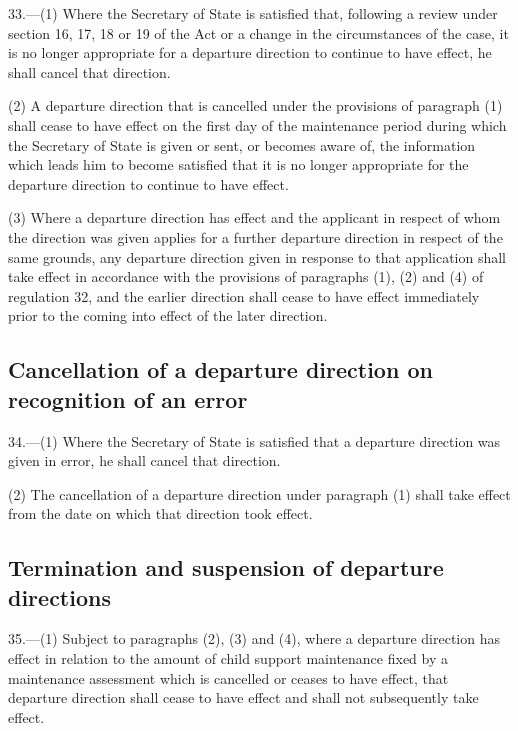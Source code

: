 \documentclass[a4paper]{article}
\begin{document}
33.—(1) Where the Secretary
of State is satisfied that, following a review under section 16, 17, 18 or 19 of
the Act or a change in the circumstances of the case, it is no longer
appropriate for a departure direction to continue to have effect, he shall
cancel that direction.

(2) A departure direction that is cancelled under the provisions of paragraph
(1) shall cease to have effect on the first day of the maintenance period during
which the Secretary of State is given or sent, or becomes aware of, the
information which leads him to become satisfied that it is no longer appropriate
for the departure direction to continue to have effect.

(3) Where a departure direction has effect and the applicant in respect of whom
the direction was given applies for a further departure direction in respect of
the same grounds, any departure direction given in response to that application
shall take effect in accordance with the provisions of paragraphs (1), (2) and
(4) of regulation 32, and the earlier direction shall cease to have effect
immediately prior to the coming into effect of the later direction.

\subsection[34. Cancellation of a departure direction on recognition of an error]{Cancellation of a departure direction on recognition of an error}

34.—(1) Where
the Secretary of State is satisfied that a departure direction was given in
error, he shall cancel that direction.

(2) The cancellation of a departure direction under paragraph (1) shall take
effect from the date on which that direction took effect.

\subsection[35. Termination and suspension of departure directions]{Termination and suspension of departure directions}

35.—(1) Subject to paragraphs
(2), (3) and (4), where a departure direction has effect in relation to the
amount of child support maintenance fixed by a maintenance assessment which is
cancelled or ceases to have effect, that departure direction shall cease to have
effect and shall not subsequently take effect.
\end{document}
